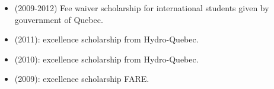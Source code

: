 \documentclass[12pt,a4paper,sans]{moderncv}
\begin{document}
\begin{itemize}
    \item (2009-2012) Fee waiver scholarship for international students given
    by gouvernment of Quebec.
    \item (2011): excellence scholarship from Hydro-Quebec.
    \item (2010): excellence scholarship from Hydro-Quebec.
    \item (2009): excellence scholarship FARE.
\end{itemize}


\end{document}
